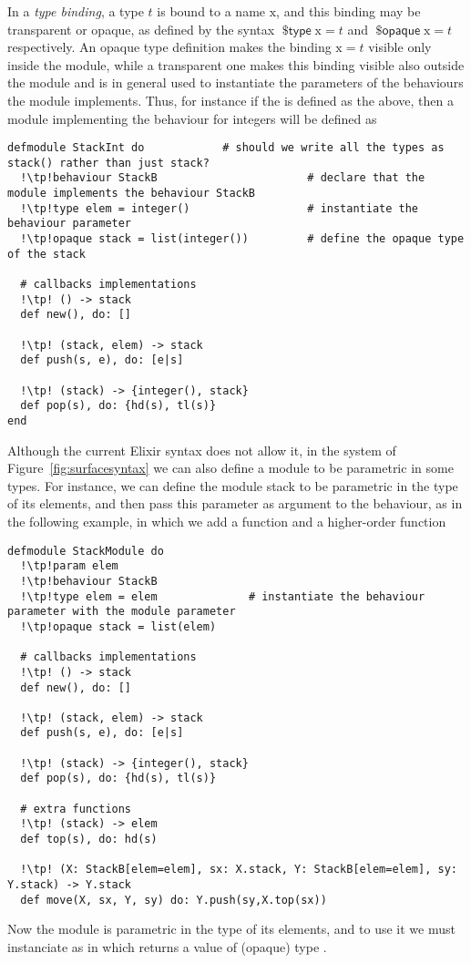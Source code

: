 \documentclass[a4paper,10pt]{article}
\DeclareMathOperator{\kwopq}{\textsf{\$opaque}}
\DeclareMathOperator{\kwtp}{\textsf{\$type}}
\newcommand{\tx}{\textrm{x}}
\begin{document}
In a \emph{type binding}, a type $t$ is bound to a name $\tx$, and this binding may be transparent or opaque, as defined by the syntax $\kwtp \tx = t$ and $\kwopq \tx =t$ respectively. An opaque type definition makes the binding $\tx= t$ visible only inside the module, while a transparent one makes this binding visible also outside the module and is in general used to instantiate the parameters of the behaviours the module implements. Thus, for instance if the  is defined as the above, then a module  implementing the behaviour for integers will be defined as
\begin{verbatim}
defmodule StackInt do            # should we write all the types as stack() rather than just stack?
  !\tp!behaviour StackB                       # declare that the module implements the behaviour StackB 
  !\tp!type elem = integer()                  # instantiate the behaviour parameter
  !\tp!opaque stack = list(integer())         # define the opaque type of the stack

  # callbacks implementations
  !\tp! () -> stack
  def new(), do: []

  !\tp! (stack, elem) -> stack
  def push(s, e), do: [e|s] 

  !\tp! (stack) -> {integer(), stack}
  def pop(s), do: {hd(s), tl(s)} 
end
\end{verbatim}
Although the current Elixir syntax does not allow it, in the system of Figure~\ref{fig:surfacesyntax} we can also define a module to be parametric in some types. For instance, we can define the module stack to be parametric in the type of
its elements, and then pass this parameter as argument to the behaviour, as in
the following example, in which we add a   function and  a
higher-order function 
\begin{verbatim}
defmodule StackModule do
  !\tp!param elem
  !\tp!behaviour StackB
  !\tp!type elem = elem              # instantiate the behaviour parameter with the module parameter
  !\tp!opaque stack = list(elem)

  # callbacks implementations
  !\tp! () -> stack
  def new(), do: []

  !\tp! (stack, elem) -> stack
  def push(s, e), do: [e|s] 

  !\tp! (stack) -> {integer(), stack}
  def pop(s), do: {hd(s), tl(s)} 

  # extra functions
  !\tp! (stack) -> elem
  def top(s), do: hd(s)

  !\tp! (X: StackB[elem=elem], sx: X.stack, Y: StackB[elem=elem], sy: Y.stack) -> Y.stack
  def move(X, sx, Y, sy) do: Y.push(sy,X.top(sx))
\end{verbatim}
Now the module  is parametric in the type of its elements, and to use it we must instanciate as in  which returns a value of (opaque) type .
\end{document}
